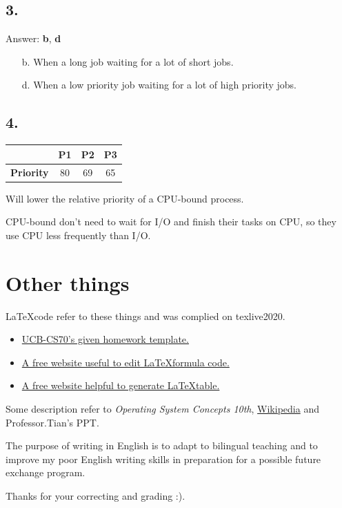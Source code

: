 \documentclass[11pt]{article}
\begin{document}
\subsection*{3. }
Answer: \textbf{b}, \textbf{d}

\begin{enumerate}
    \item[b.] When a long job waiting for a lot of short jobs.
    \item[d.] When a low priority job waiting for a lot of high priority jobs.
\end{enumerate}

\subsection*{4. }


\begin{table}[H]
    \centering
    \begin{tabular}{|c|c|c|c|}
    \hline
    \textbf{}         & \textbf{P1} & \textbf{P2} & \textbf{P3} \\ \hline
    \textbf{Priority} & 80          & 69          & 65          \\ \hline
    \end{tabular}
\end{table}

 
    Will lower the relative priority of a CPU-bound process. 
    
    CPU-bound don't need to wait for 
    I/O and finish their tasks on CPU, so they use CPU less frequently than I/O.


\section*{Other things}

    \LaTeX \space code refer to these things and was complied on texlive2020.
    \begin{itemize}
        \item  \href{https://www.eecs70.org/assets/misc/homework_template.tex}{UCB-CS70's given homework template.} 
        \item  \href{https://www.latexlive.com}{A free website useful to edit \LaTeX \space formula code.}
        \item  \href{https://www.tablesgenerator.com/}{A free website helpful to generate \LaTeX \space table.}
    \end{itemize}

    Some description refer to \textit{Operating System Concepts 10th}, \href{https://en.wikipedia.org}{Wikipedia} and Professor.Tian's PPT.

    The purpose of writing in English is to adapt to bilingual teaching and to improve my poor English 
    writing skills in preparation for a possible future exchange program. 

    Thanks for your correcting and grading :).
\end{document}
